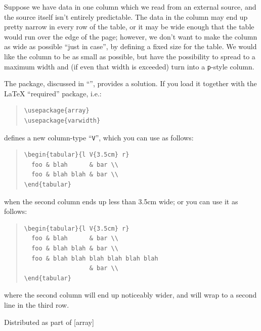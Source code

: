 Suppose we have data in one column which we read from an external
source, and the source itself isn't entirely predictable.  The data in
the column may end up pretty narrow in every row of the table, or it
may be wide enough that the table would run over the edge of the page;
however, we don't want to make the column as wide as possible ``just
in case'', by defining a fixed size for the table.  We would like the
column to be as small as possible, but have the possibility to spread
to a maximum width and (if even that width is exceeded) turn into a
\texttt{p}-style column.

The  package, discussed in %
``'', provides
a solution.  If you load it together with the \LaTeX{} ``required''
 package, i.e.:
\begin{quote}
\begin{verbatim}
\usepackage{array}
\usepackage{varwidth}
\end{verbatim}
\end{quote}
 defines a new column-type ``\texttt{V}'', which you
can use as follows:
\begin{quote}
\begin{verbatim}
\begin{tabular}{l V{3.5cm} r}
  foo & blah      & bar \\
  foo & blah blah & bar \\
\end{tabular}
\end{verbatim}
\end{quote}
when the second column ends up less than 3.5cm wide;
or you can use it as follows:
\begin{quote}
\begin{verbatim}
\begin{tabular}{l V{3.5cm} r}
  foo & blah      & bar \\
  foo & blah blah & bar \\
  foo & blah blah blah blah blah blah
                  & bar \\
\end{tabular}
\end{verbatim}
\end{quote}
where the second column will end up noticeably wider, and will wrap to
a second line in the third row.
\begin{ctanrefs}
\item[array.sty]Distributed as part of [array]
\item[varwidth.sty]
\end{ctanrefs}

